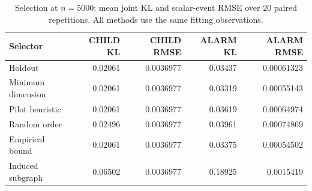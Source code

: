 \begin{table}[tbp]\centering
\caption{Selection at $n=5000$: mean joint KL and scalar-event RMSE over 20 paired repetitions. All methods use the same fitting observations.}\label{tab:new-selection}
\begin{tabular}{lrrrr}
\toprule
Selector & CHILD KL & CHILD RMSE & ALARM KL & ALARM RMSE\\
\midrule
Holdout & 0.02061 & 0.0036977 & 0.03437 & 0.00061323\\
Minimum dimension & 0.02061 & 0.0036977 & 0.03319 & 0.00055143\\
Pilot heuristic & 0.02061 & 0.0036977 & 0.03619 & 0.00064974\\
Random order & 0.02496 & 0.0036977 & 0.03961 & 0.00074869\\
Empirical bound & 0.02061 & 0.0036977 & 0.03375 & 0.00054502\\
Induced subgraph & 0.06502 & 0.0036977 & 0.18925 & 0.0015419\\
\bottomrule\end{tabular}\end{table}
